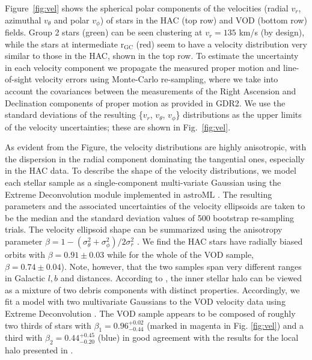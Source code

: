 \documentclass[fleqn,usenatbib]{mnras}
\begin{document}
Figure~\ref{fig:vel} shows the spherical polar components of the
velocities (radial $v_{r}$, azimuthal $v_{\theta}$ and polar
$v_{\phi}$) of stars in the HAC (top row) and VOD (bottom row)
fields. Group 2 stars (green) can be seen clustering at $v_{r} = 135$
km/s (by design), while the stars at intermediate $\mathrm{r_{GC}}$
(red) seem to have a velocity distribution very similar to those in
the HAC, shown in the top row. To estimate the uncertainty in each
velocity component we propagate the measured proper motion and
line-of-sight velocity errors using Monte-Carlo re-sampling, where we
take into account the covariances between the measurements of the
Right Ascension and Declination components of proper motion as
provided in GDR2. We use the standard deviations of the resulting
\{$v_{r}$, $v_{\theta}$, $v_{\phi}$\} distributions as the upper limits
of the velocity uncertainties; these are shown in Fig.~\ref{fig:vel}.


As evident from the Figure, the velocity distributions are highly
anisotropic, with the dispersion in the radial component dominating
the tangential ones, especially in the HAC data. To describe the shape
of the velocity distributions, we model each stellar sample as a
single-component multi-variate Gaussian using the Extreme
Deconvolution module implemented in $\mathrm{astroML}$
\citep{astroML}. The resulting parameters and the associated
uncertainties of the velocity ellipsoids are taken to be the median
and the standard deviation values of 500 bootstrap re-sampling trials.
The velocity ellipsoid shape can be summarized using the anisotropy
parameter $\beta=1-(\sigma^2_{\theta}+\sigma^2_{\phi})/2\sigma^2_r$
\citep[see][]{Binney2008}. We find the HAC stars have radially biased
orbits with $\beta = 0.91 \pm 0.03$ while for the whole of the VOD
sample, $\beta = 0.74 \pm 0.04$). Note, however, that the two samples
span very different ranges in Galactic $l,b$ and distances. According
to \citet{Belokurov2018}, the inner stellar halo can be viewed as a
mixture of two debris components with distinct
properties. Accordingly, we fit a model with two multivariate
Gaussians to the VOD velocity data using Extreme Deconvolution
\citep[see][]{ED}. The VOD sample appears to be composed of roughly
two thirds of stars with $\beta_{1}= 0.96^{+0.02}_{-0.44}$ (marked in
magenta in Fig. \ref{fig:vel}) and a third with
$\beta_{2}=0.44^{+0.45}_{-0.20}$ (blue) in good agreement with the
results for the local halo presented in \citet{Belokurov2018}.
\end{document}
